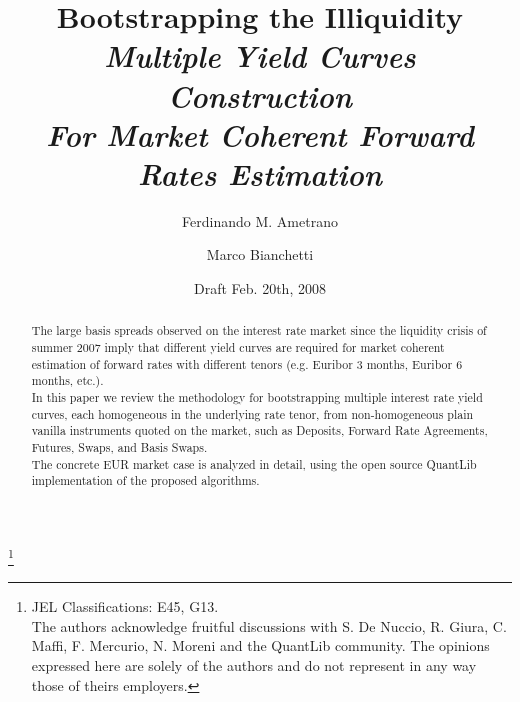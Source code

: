 \documentclass[11pt,reqno]{amsart}
\begin{document}
\title[Bootstrapping the Illiquidity]{Bootstrapping the Illiquidity \\ \footnotesize{\emph{Multiple Yield Curves Construction \\
For Market Coherent Forward Rates Estimation}}}

\author{Ferdinando M. Ametrano}
\address{Financial Engineering, Banca IMI, Piazzetta G. Dell'Amore 3, 20121
Milan Italy, ferdinando.ametrano(AT)bancaimi.com}

\author{Marco Bianchetti}
\address{Risk Management, Banca IntesaSanpaolo, Piazza G. Ferrari 10, 20121
Milan Italy, marco.bianchetti(AT)intesasanpaolo.com}

\thanks{JEL Classifications: E45, G13. \\
The authors acknowledge fruitful discussions with S. De Nuccio, R. Giura, C. Maffi, F. Mercurio, N. Moreni and the QuantLib community. The opinions expressed here are solely of the authors and do not represent in any way those of theirs employers.}

\date{Draft Feb. 20th, 2008}


\begin{abstract}
The large basis spreads observed on the interest rate market since the liquidity crisis of summer 2007 imply that different yield curves are required for market coherent estimation of forward rates with different tenors (e.g. Euribor 3 months, Euribor 6 months, etc.).
\\ In this paper we review the methodology for bootstrapping multiple interest rate yield curves, each homogeneous in the underlying rate tenor, from non-homogeneous plain vanilla instruments quoted on the market, such as Deposits, Forward Rate Agreements, Futures, Swaps, and Basis Swaps. \\
The concrete EUR market case is analyzed in detail, using the open source QuantLib implementation of the proposed algorithms.
\end{abstract}

\maketitle
\end{document}
